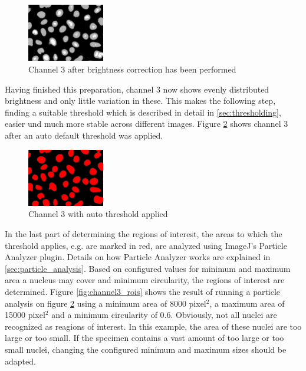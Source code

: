 \documentclass[a4paper, 12pt]{article}
\begin{document}
\begin{figure}
\vspace{-14pt}
\includegraphics[width=0.3\textwidth]{images/example_Kanal3_multiply178_gaussian2}
\caption{Channel 3 after brightness correction has been performed}
\label{fig:example_channel3_prepared}
\end{figure}

Having finished this preparation, channel 3 now shows evenly distributed
brightness and only little variation in these. This makes the following step,
finding a suitable threshold which is described in detail in
\ref{sec:thresholding}, easier und much more stable across different images.
Figure \ref{fig:channel3_threshold} shows channel 3 after an auto
default threshold was applied.

\begin{figure}
\vspace{-14pt}
\includegraphics[width=0.3\textwidth]{images/example_Kanal3_corrected_threshold}
\caption{Channel 3 with auto threshold applied}
\label{fig:channel3_threshold}
\end{figure}

In the last part of determining the regions of interest, the areas to which the
threshold applies, e.g. are marked in red, are analyzed using ImageJ's
Particle Analyzer plugin. Details on how Particle Analyzer works are explained
in \ref{sec:particle_analysis}. Based on configured values for minimum and
maximum area a nucleus may cover and minimum circularity, the regions of
interest are determined. Figure \ref{fig:channel3_rois} shows the result of
running a particle analysis on figure \ref{fig:channel3_threshold} using a
minimum area of 8000 pixel$^2$, a maximum area of 15000 pixel$^2$ and a minimum
circularity of 0.6. Obviously, not all nuclei are recognized as reagions of
interest. In this example, the area of these nuclei are too large or too small.
If the specimen contains a vast amount of too large or too small nuclei,
changing the configured minimum and maximum sizes should be adapted. 
\end{document}
